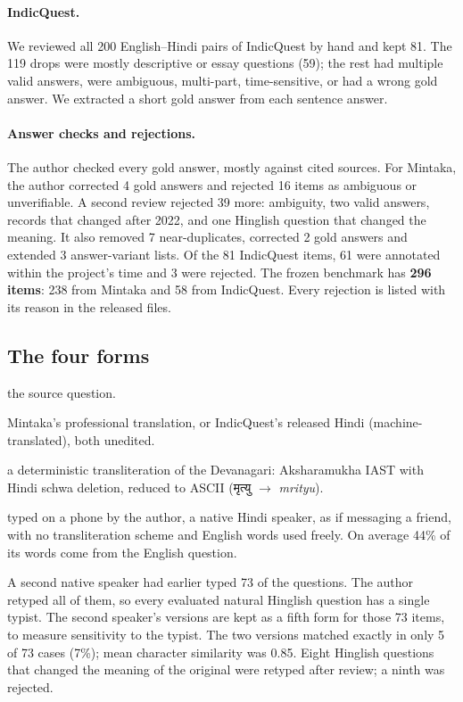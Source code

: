 \documentclass[11pt]{article}
\newcommand{\hi}[1]{{\devfont #1}}
\newcommand{\Dev}{Devanagari}
\newcommand{\Hng}{natural Hinglish}
\newcommand{\HngC}{Natural Hinglish}
\newcommand{\RomC}{Rule-based Roman}
\begin{document}
\paragraph{IndicQuest.}
We reviewed all 200 English--Hindi pairs of IndicQuest \citep{rohera2024indicquest} by hand and kept 81. The 119 drops were mostly descriptive or essay questions (59); the rest had multiple valid answers, were ambiguous, multi-part, time-sensitive, or had a wrong gold answer.
We extracted a short gold answer from each sentence answer.

\paragraph{Answer checks and rejections.}
The author checked every gold answer, mostly against cited sources.
For Mintaka, the author corrected 4 gold answers and rejected 16 items as ambiguous or unverifiable.
A second review rejected 39 more: ambiguity, two valid answers, records that changed after 2022, and one Hinglish question that changed the meaning.
It also removed 7 near-duplicates, corrected 2 gold answers and extended 3 answer-variant lists.
Of the 81 IndicQuest items, 61 were annotated within the project's time and 3 were rejected.
The frozen benchmark has \textbf{296 items}: 238 from Mintaka and 58 from IndicQuest.
Every rejection is listed with its reason in the released files.

\subsection{The four forms}
\begin{description}\setlength\itemsep{0pt}
\item[English] the source question.
\item[\Dev{}] Mintaka's professional translation, or IndicQuest's released Hindi (machine-translated), both unedited.
\item[\RomC{}] a deterministic transliteration of the \Dev{}: Aksharamukha IAST \citep{rajan2026aksharamukha} with Hindi schwa deletion, reduced to ASCII (\hi{मृत्यु} $\to$ \emph{mrityu}).
\item[\HngC{}] typed on a phone by the author, a native Hindi speaker, as if messaging a friend, with no transliteration scheme and English words used freely. On average 44\% of its words come from the English question.
\end{description}
A second native speaker had earlier typed 73 of the questions.
The author retyped all of them, so every evaluated \Hng{} question has a single typist.
The second speaker's versions are kept as a fifth form for those 73 items, to measure sensitivity to the typist.
The two versions matched exactly in only 5 of 73 cases (7\%); mean character similarity was 0.85.
Eight Hinglish questions that changed the meaning of the original were retyped after review; a ninth was rejected.
\end{document}
